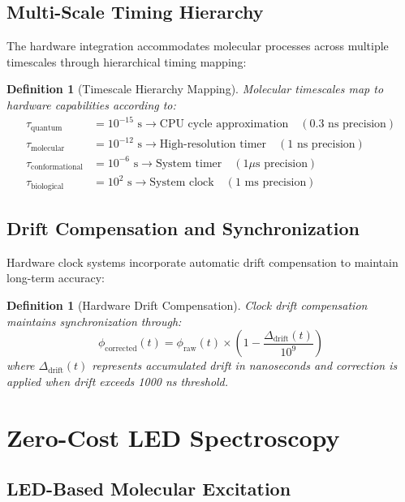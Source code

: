 \documentclass[12pt,a4paper]{article}
\newtheorem{definition}[theorem]{Definition}
\begin{document}
\subsection{Multi-Scale Timing Hierarchy}

The hardware integration accommodates molecular processes across multiple timescales through hierarchical timing mapping:

\begin{definition}[Timescale Hierarchy Mapping]
Molecular timescales map to hardware capabilities according to:
\begin{align}
\tau_{\text{quantum}} &= 10^{-15} \text{ s} \rightarrow \text{CPU cycle approximation} \quad (0.3 \text{ ns precision}) \\
\tau_{\text{molecular}} &= 10^{-12} \text{ s} \rightarrow \text{High-resolution timer} \quad (1 \text{ ns precision}) \\
\tau_{\text{conformational}} &= 10^{-6} \text{ s} \rightarrow \text{System timer} \quad (1 \mu\text{s precision}) \\
\tau_{\text{biological}} &= 10^{2} \text{ s} \rightarrow \text{System clock} \quad (1 \text{ ms precision})
\end{align}
\end{definition}

\subsection{Drift Compensation and Synchronization}

Hardware clock systems incorporate automatic drift compensation to maintain long-term accuracy:

\begin{definition}[Hardware Drift Compensation]
Clock drift compensation maintains synchronization through:
\begin{equation}
\phi_{\text{corrected}}(t) = \phi_{\text{raw}}(t) \times \left(1 - \frac{\Delta_{\text{drift}}(t)}{10^9}\right)
\end{equation}
where $\Delta_{\text{drift}}(t)$ represents accumulated drift in nanoseconds and correction is applied when drift exceeds 1000 ns threshold.
\end{definition}

\section{Zero-Cost LED Spectroscopy}

\subsection{LED-Based Molecular Excitation}
\end{document}
